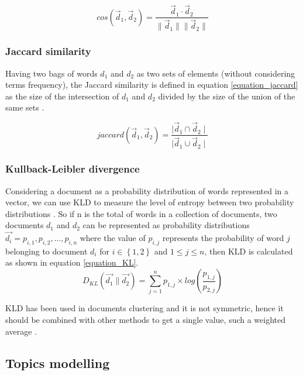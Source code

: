 \documentclass[preprint,12pt,3p]{elsarticle}
\begin{document}
\begin{equation}
\label{equation_cosine}
cos(\vec{d}_{1},\vec{d}_{2})=\frac{\vec{d}_{1}\cdot\vec{d}_{2}}{\parallel \vec{d}_{1}\parallel \parallel \vec{d}_{2} \parallel }
\end{equation}

\subsubsection{Jaccard similarity}
Having two bags of words ${d_{1}}$ and ${d_{2}}$ as two sets of elements (without considering terms frequency), the Jaccard similarity is defined in equation \ref{equation_jaccard} as the size of the intersection of ${d_{1}}$ and ${d_{2}}$ divided by the size of the union of the same sets \cite{aggarwal2015data}.

\begin{equation}
\label{equation_jaccard}
jaccard(\vec{d}_{1},\vec{d}_{2}) = \frac{\mid \vec{d}_{1}\cap \vec{d}_{2}\mid}{\mid\vec{d}_{1}\cup \vec{d}_{2}\mid}
\end{equation}

\subsubsection{Kullback-Leibler divergence}

Considering a document as a probability distribution of words represented in a vector, we can use KLD to measure the level of entropy between two probability distributions \cite{huang2008similarity}. So if n is the total of words in a collection of documents, two documents ${d_{1}}$ and ${d_{2}}$ can be represented as probability distributions ${\vec{d_{i}}=p_{i,1}, p_{i,2},…, p_{i,n}}$ where the value of ${p_{i,j}}$ represents the probability of word $j$ belonging to document ${d_{i}}$ for ${i \in \left \{ 1,2 \right \}}$ and ${1 \leq  j \leq  n}$, then KLD is calculated as shown in equation \ref{equation_KL}.
\begin{equation}
\label{equation_KL}
D_{KL}(\vec{d_{1}}\parallel\vec{d_{2}})=\sum_{j=1}^{n}{p_{1,j}\times log(\frac{p_{1,j}}{p_{2,j}})}
\end{equation}

KLD has been used in documents clustering and it is not symmetric, hence it should be combined with other methods to get a single value, such a weighted average \cite{huang2008similarity}.\par

\subsection{Topics modelling}
\end{document}
